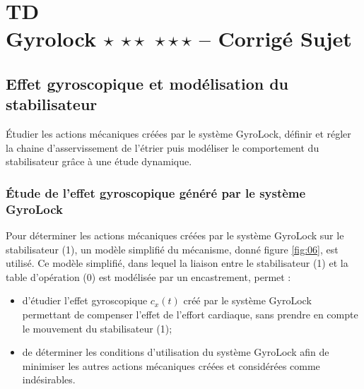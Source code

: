 \chapter*{TD  \\ 
Gyrolock  \ifnormal $\star$ \else \fi \ifdifficile $\star\star$ \else \fi \iftdifficile $\star\star\star$ \else \fi
-- \ifprof Corrigé \else Sujet \fi}

\iflivret {} \else
\ifprof  {} \else \fi
\fi

\setcounter{question}{0}

\ifprof  {}\else \fi

\section*{Effet gyroscopique et modélisation du stabilisateur}
\begin{obj}
Étudier les actions mécaniques créées par le système GyroLock, définir et régler la chaine d'asservissement de l'étrier puis modéliser le comportement du stabilisateur grâce à une étude dynamique.
\end{obj}

\subsection*{\label{sec:IIA} Étude de l'effet gyroscopique généré par le système GyroLock}

\ifprof
\else
Pour déterminer les actions mécaniques créées par le système GyroLock sur le stabilisateur (1), un modèle simplifié du mécanisme, donné figure \ref{fig:06}, est utilisé. Ce modèle simplifié, dans lequel la liaison entre le stabilisateur (1) et la table d'opération (0) est modélisée par un encastrement, permet :

\begin{itemize}
  \item d'étudier l'effet gyroscopique $c_{x}(t)$ créé par le système GyroLock permettant de compenser l'effet de l'effort cardiaque, sans prendre en compte le mouvement du stabilisateur (1);

  \item de déterminer les conditions d'utilisation du système GyroLock afin de minimiser les autres actions mécaniques créées et considérées comme indésirables.
\end{itemize}


